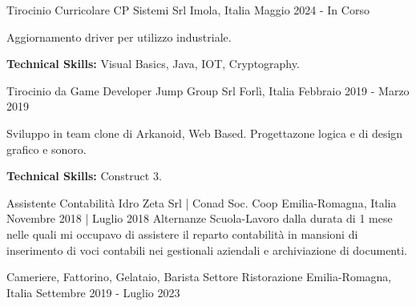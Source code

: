 

\begin{cventries}

    \cventry
    {Tirocinio Curricolare} %
    {CP Sistemi Srl} %
    {Imola, Italia} %
    {Maggio 2024 - In Corso} %
    {
      \begin{cvitems} %
        \item {Aggiornamento driver per utilizzo industriale.}
        \item {\textbf{Technical Skills:} Visual Basics, Java, IOT, Cryptography.}
      \end{cvitems}
    }

    \cventry
    {Tirocinio da Game Developer} %
    {Jump Group Srl} %
    {Forlì, Italia} %
    {Febbraio 2019 - Marzo 2019} %
    {
      \begin{cvitems} %
        \item {Sviluppo in team clone di Arkanoid, Web Based. Progettazone logica e di design grafico e sonoro.}
        \item {\textbf{Technical Skills:} Construct 3.}
      \end{cvitems}
    }

    \cventry
    {Assistente Contabilità} %
    {Idro Zeta Srl | Conad Soc. Coop} %
    {Emilia-Romagna, Italia} %
    {Novembre 2018 | Luglio 2018} %
    {Alternanze Scuola-Lavoro dalla durata di 1 mese nelle quali mi occupavo di assistere il reparto contabilità in mansioni di inserimento di voci contabili nei gestionali aziendali e archiviazione di documenti.}

    \cventry
    {Cameriere, Fattorino, Gelataio, Barista} %
    {Settore Ristorazione} %
    {Emilia-Romagna, Italia} %
    {Settembre 2019 - Luglio 2023} %
    {}

\end{cventries}
